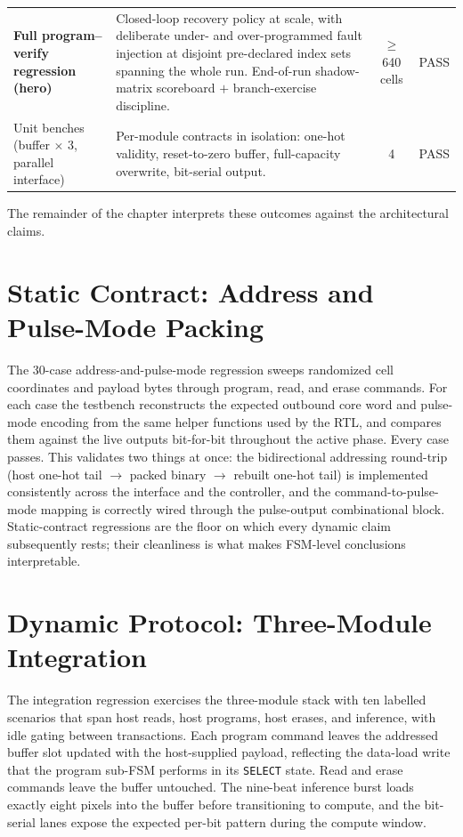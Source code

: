 \begin{table}[h]
\begin{tabularx}{\linewidth}{l X c c}
        \textbf{Full program--verify regression (hero)} &
            Closed-loop recovery policy at scale, with deliberate
            under- and over-programmed fault injection at disjoint
            pre-declared index sets spanning the whole run. End-of-run
            shadow-matrix scoreboard $+$ branch-exercise discipline. &
            $\ge$ 640 cells & PASS \\
        Unit benches (buffer $\times$ 3, parallel interface) &
            Per-module contracts in isolation: one-hot validity,
            reset-to-zero buffer, full-capacity overwrite, bit-serial
            output. &
            4 & PASS \\
        \bottomrule
    \end{tabularx}
\end{table}

The remainder of the chapter interprets these outcomes against the
architectural claims.

\section{Static Contract: Address and Pulse-Mode Packing}
\label{sec:results-static}

The 30-case address-and-pulse-mode regression sweeps randomized cell
coordinates and payload bytes through program, read, and erase commands.
For each case the testbench reconstructs the expected outbound core word
and pulse-mode encoding from the same helper functions used by the RTL,
and compares them against the live outputs bit-for-bit throughout the
active phase. Every case passes. This validates two things at once: the
bidirectional addressing round-trip (host one-hot tail $\rightarrow$
packed binary $\rightarrow$ rebuilt one-hot tail) is implemented
consistently across the interface and the controller, and the
command-to-pulse-mode mapping is correctly wired through the pulse-output
combinational block. Static-contract regressions are the floor on which
every dynamic claim subsequently rests; their cleanliness is what makes
FSM-level conclusions interpretable.

\section{Dynamic Protocol: Three-Module Integration}
\label{sec:results-integration}

The integration regression exercises the three-module stack with ten
labelled scenarios that span host reads, host programs, host erases, and
inference, with idle gating between transactions. Each program command
leaves the addressed buffer slot updated with the host-supplied payload,
reflecting the data-load write that the program sub-FSM performs in its
\texttt{SELECT} state. Read and erase commands leave the buffer
untouched. The nine-beat inference burst loads exactly eight pixels into
the buffer before transitioning to compute, and the bit-serial lanes
expose the expected per-bit pattern during the compute window.

